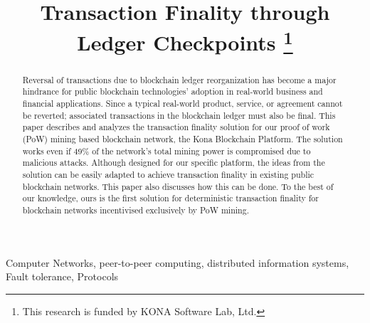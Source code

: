 \documentclass[conference]{IEEEtran}
\begin{document}
\title{Transaction Finality through Ledger Checkpoints 
	\thanks{This research is funded by KONA Software Lab, Ltd.}
}

\author{
	\and		
	\and
}
\maketitle

\begin{abstract}
Reversal of transactions due to blockchain ledger reorganization has become a major hindrance for public blockchain technologies' adoption in real-world business and financial applications. Since a typical real-world product, service, or agreement cannot be reverted; associated transactions in the blockchain ledger must also be final. This paper describes and analyzes the transaction finality solution for our proof of work (PoW) mining based blockchain network, the Kona Blockchain Platform. The solution works even if 49\% of the network's total mining power is compromised due to malicious attacks. Although designed for our specific platform, the ideas from the solution can be easily adapted to achieve transaction finality in existing public blockchain networks. This paper also discusses how this can be done. To the best of our knowledge, ours is the first solution for deterministic transaction finality for blockchain networks incentivised exclusively by PoW mining.    
\end{abstract}

\begin{IEEEkeywords}
Computer Networks, peer-to-peer computing, distributed information systems, Fault tolerance, Protocols
\end{IEEEkeywords}
\end{document}

